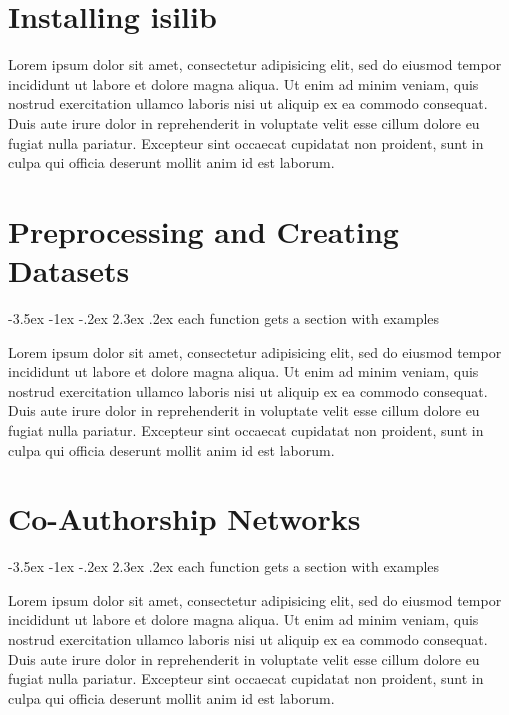 \documentclass[12pt,usenames,dvipsnames,article,oneside]{memoir}
\makeatletter
\renewcommand\section{\@startsection{section}{1}{\z@}%
                                  {-3.5ex \@plus -1ex \@minus -.2ex}%
                                  {2.3ex \@plus.2ex}%
                                  {\normalfont\large\bfseries}} %
\makeatother
\begin{document}
\pagebreak

\chapter{Installing isilib}

Lorem ipsum dolor sit amet, consectetur adipisicing elit, sed do eiusmod
tempor incididunt ut labore et dolore magna aliqua. Ut enim ad minim veniam,
quis nostrud exercitation ullamco laboris nisi ut aliquip ex ea commodo
consequat. Duis aute irure dolor in reprehenderit in voluptate velit esse
cillum dolore eu fugiat nulla pariatur. Excepteur sint occaecat cupidatat non
proident, sunt in culpa qui officia deserunt mollit anim id est laborum.

\chapter{Preprocessing and Creating Datasets}

\section{each function gets a section with examples}

Lorem ipsum dolor sit amet, consectetur adipisicing elit, sed do eiusmod tempor incididunt ut labore et dolore magna aliqua. Ut enim ad minim veniam, quis nostrud exercitation ullamco laboris nisi ut aliquip ex ea commodo consequat. Duis aute irure dolor in reprehenderit in voluptate velit esse cillum dolore eu fugiat nulla pariatur. Excepteur sint occaecat cupidatat non proident, sunt in culpa qui officia deserunt mollit anim id est laborum.

\chapter{Co-Authorship Networks}

\section{each function gets a section with examples}

Lorem ipsum dolor sit amet, consectetur adipisicing elit, sed do eiusmod tempor incididunt ut labore et dolore magna aliqua. Ut enim ad minim veniam, quis nostrud exercitation ullamco laboris nisi ut aliquip ex ea commodo consequat. Duis aute irure dolor in reprehenderit in voluptate velit esse cillum dolore eu fugiat nulla pariatur. Excepteur sint occaecat cupidatat non proident, sunt in culpa qui officia deserunt mollit anim id est laborum.
\end{document}
